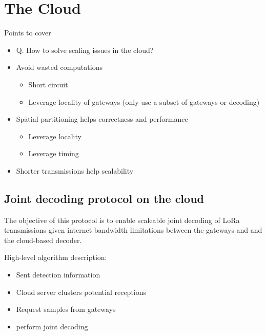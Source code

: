 \section{The Cloud}
\label{sec:cloud}

{\color{blue}
Points to cover
\begin{itemize} 
    \item Q. How to solve scaling issues in the cloud?
    \item Avoid wasted computations
        \begin{itemize}
            \item Short circuit
            \item Leverage locality of gateways (only use a subset of gateways  or decoding)
        \end{itemize}
    \item Spatial partitioning helps correctness and performance
        \begin{itemize}
            \item Leverage locality
            \item Leverage timing
        \end{itemize}
    \item Shorter transmissions help scalability
\end{itemize}
}

\subsection{Joint decoding protocol on the cloud}


The objective of this protocol is to enable scaleable joint decoding of LoRa
transmissions given internet bandwidth limitations between the gateways and
and the cloud-based decoder.

{\color{blue} High-level algorithm description:
\begin{itemize}
    \item Sent detection information
    \item Cloud server clusters potential receptions
    \item Request samples from gateways
    \item perform joint decoding
\end{itemize}
}
